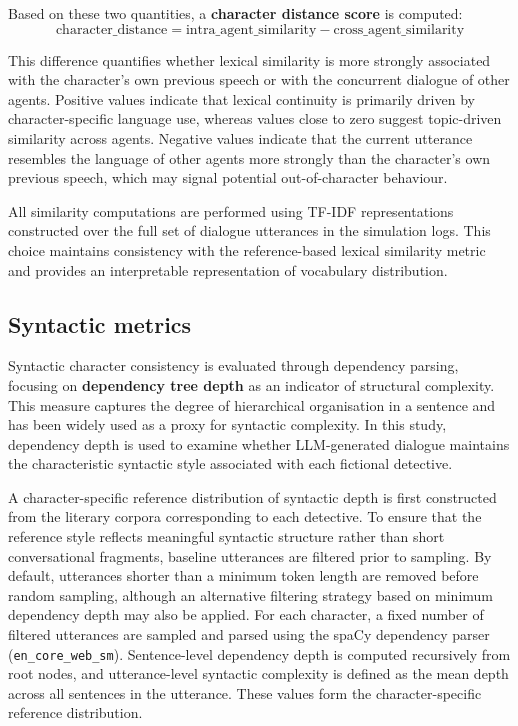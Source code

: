 \documentclass{article}
\begin{document}
Based on these two quantities, a \textbf{character distance score} is computed:
\begin{equation}
    \text{character\_distance} = \text{intra\_agent\_similarity} - \text{cross\_agent\_similarity}
    \label{eq:placeholder_label}
\end{equation}

This difference quantifies whether lexical similarity is more strongly associated with the character’s own previous speech or with the concurrent dialogue of other agents. Positive values indicate that lexical continuity is primarily driven by character-specific language use, whereas values close to zero suggest topic-driven similarity across agents. Negative values indicate that the current utterance resembles the language of other agents more strongly than the character’s own previous speech, which may signal potential out-of-character behaviour.

All similarity computations are performed using TF-IDF representations constructed over the full set of dialogue utterances in the simulation logs. This choice maintains consistency with the reference-based lexical similarity metric and provides an interpretable representation of vocabulary distribution.

\subsection{Syntactic metrics}

Syntactic character consistency is evaluated through dependency parsing, focusing on \textbf{dependency tree depth} as an indicator of structural complexity. This measure captures the degree of hierarchical organisation in a sentence and has been widely used as a proxy for syntactic complexity. In this study, dependency depth is used to examine whether LLM-generated dialogue maintains the characteristic syntactic style associated with each fictional detective.

A character-specific reference distribution of syntactic depth is first constructed from the literary corpora corresponding to each detective. To ensure that the reference style reflects meaningful syntactic structure rather than short conversational fragments, baseline utterances are filtered prior to sampling. By default, utterances shorter than a minimum token length are removed before random sampling, although an alternative filtering strategy based on minimum dependency depth may also be applied. For each character, a fixed number of filtered utterances are sampled and parsed using the spaCy dependency parser (\texttt{en\_core\_web\_sm}). Sentence-level dependency depth is computed recursively from root nodes, and utterance-level syntactic complexity is defined as the mean depth across all sentences in the utterance. These values form the character-specific reference distribution.
\end{document}
